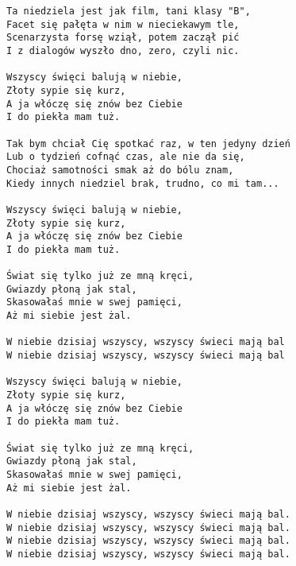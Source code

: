 \documentclass[12pt]{article}
\begin{document}
\begin{verbatim}
Ta niedziela jest jak film, tani klasy "B",
Facet się pałęta w nim w nieciekawym tle,
Scenarzysta forsę wziął, potem zaczął pić
I z dialogów wyszło dno, zero, czyli nic.

Wszyscy święci balują w niebie,
Złoty sypie się kurz,
A ja włóczę się znów bez Ciebie
I do piekła mam tuż.

Tak bym chciał Cię spotkać raz, w ten jedyny dzień
Lub o tydzień cofnąć czas, ale nie da się,
Chociaż samotności smak aż do bólu znam,
Kiedy innych niedziel brak, trudno, co mi tam...

Wszyscy święci balują w niebie,
Złoty sypie się kurz,
A ja włóczę się znów bez Ciebie
I do piekła mam tuż.

Świat się tylko już ze mną kręci,
Gwiazdy płoną jak stal,
Skasowałaś mnie w swej pamięci,
Aż mi siebie jest żal.

W niebie dzisiaj wszyscy, wszyscy świeci mają bal
W niebie dzisiaj wszyscy, wszyscy świeci mają bal

Wszyscy święci balują w niebie,
Złoty sypie się kurz,
A ja włóczę się znów bez Ciebie
I do piekła mam tuż.

Świat się tylko już ze mną kręci,
Gwiazdy płoną jak stal,
Skasowałaś mnie w swej pamięci,
Aż mi siebie jest żal.

W niebie dzisiaj wszyscy, wszyscy świeci mają bal.
W niebie dzisiaj wszyscy, wszyscy świeci mają bal.
W niebie dzisiaj wszyscy, wszyscy świeci mają bal.
W niebie dzisiaj wszyscy, wszyscy świeci mają bal.
\end{verbatim}
\clearpage
\end{document}
